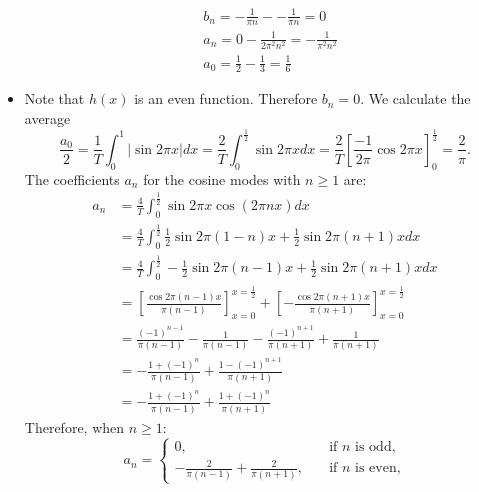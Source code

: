 \documentclass[11pt]{article}
\begin{document}
\begin{solution}
\begin{itemize}
\begin{align*}
                    &b_n = -\frac{1}{\pi n} - - \frac{1}{\pi n} = 0
                    \\& 
            a_n = 0 - \frac{1}{2\pi^2 n^2} =  - \frac{1}{\pi^2 n^2} 
                    \\&
            a_0 = \frac{1}{2} - \frac{1}{3} = \frac{1}{6}
        \end{align*}	
        \item
        Note that $h(x)$ is an even function.
        Therefore $b_n = 0$. 
        We calculate the average 
        \[
            \frac{a_0}{2}
            = 
            \frac{1}{T} \int_{0}^{1} |\sin 2\pi x| dx  
            = 
            \frac{2}{T} \int_{0}^{\frac 1 2} \sin 2\pi x dx  
            =  
            \frac 2 T
            \left[ \frac{-1}{2\pi} \cos{2\pi x} \right]_{0}^{\frac 1 2} 
            =
            \frac{2}{\pi} 
            .
        \]
        The coefficients $a_n$ for the cosine modes with $n \geq 1$ are:
        \begin{align*}
            a_n 
            &
            = 
            \frac{4}{T}
            \int_{0}^{\frac 1 2} \sin 2\pi x \cos(2\pi n x) dx
            \\&
            =
            \frac{4}{T}
            \int_{0}^{\frac 1 2} \frac 1 2 \sin{2\pi(1-n)x} + \frac 1 2 \sin{2\pi(n+1)x} dx
            \\&
		=
            \frac{4}{T}
            \int_{0}^{\frac 1 2} -\frac 1 2 \sin{2\pi(n-1)x} + \frac 1 2 \sin{2\pi(n+1)x} dx
            \\&
            =
            \left[\frac{ \cos2\pi(n-1)x }{ \pi(n-1) } \right]_{x=0}^{x=\frac 1 2}
            +
            \left[- \frac{ \cos2\pi(n+1)x }{ \pi(n+1) } \right]_{x=0}^{x=\frac 1 2}
            \\&
            = 
            \frac{(-1)^{n-1}}{\pi(n-1)} -  \frac{1}{\pi(n-1)}  - \frac{(-1)^{n+1}}{\pi(n+1)} + \frac{1}{\pi(n+1)}
            \\&
            = -\frac{1+(-1)^{n}}{\pi(n-1)} +  \frac{1-(-1)^{n+1}}{\pi(n+1)} 
            \\&
            = -\frac{1+(-1)^{n}}{\pi(n-1)} +  \frac{1+(-1)^{n}}{\pi(n+1)} 
        \end{align*}	
        Therefore, when $n \geq 1$:
        \[a_n = 
        \begin{cases}
        0 ,\quad &\text{if } n\text{ is odd,}\\
        -\frac{2}{\pi(n-1)} + \frac{2}{\pi(n+1)}  ,\quad &\text{if } n\text{ is even,}
        \end{cases}
        \]
       \end{itemize}
\end{solution}
\end{document}
